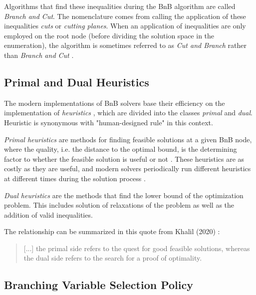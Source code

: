Algorithms that find these inequalities during the \gls{BnB} algorithm are called \textit{Branch and Cut}. The nomenclature comes from calling the application of these inequalities \textit{cuts} or \textit{cutting planes}.
When an application of inequalities are only employed on the root node (before dividing the solution space in the enumeration), the algorithm is sometimes referred to as \textit{Cut and Branch} rather than \textit{Branch and Cut} \cite{wolsey2020integer}.






\subsection{Primal and Dual Heuristics}

The modern implementations of \gls{BnB} solvers base their efficiency on the implementation of \textit{heuristics} \cite{khalil2020towards}, which are divided into the classes \textit{primal} and \textit{ dual}. Heuristic is synonymous with "human-designed rule" in this context.

\textit{Primal heuristics} are methods for finding feasible solutions at a given \gls{BnB} node, where the quality, i.e. the distance to the optimal bound, is the determining factor to whether the feasible solution is useful or not \cite{khalil2020towards}. These heuristics are as costly as they are useful, and modern solvers periodically run different heuristics at different times during the solution process \cite{khalil2020towards}.

\textit{Dual heuristics} are the methods that find the lower bound of the optimization problem. This includes solution of relaxations of the problem as well as the addition of valid inequalities. 

The relationship can be summarized in this quote from Khalil (2020) \cite{khalil2020towards}:
\begin{quote}
    [...] the
primal side refers to the quest for good feasible solutions, whereas the dual side refers to
the search for a proof of optimality.
\end{quote}






\subsection{Branching Variable Selection Policy}\label{ssec:branchingpolicy}


